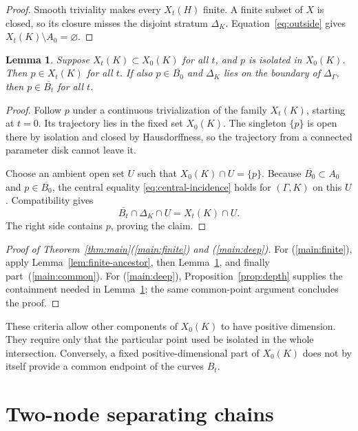 \documentclass[11pt]{article}
\newcommand{\cl}[1]{\overline{#1}}
\newtheorem{lemma}[theorem]{Lemma}
\theoremstyle{definition}
\theoremstyle{remark}
\begin{document}
\begin{proof}
Smooth triviality makes every $X_t(H)$ finite. A finite subset of $X$ is closed, so its closure misses the disjoint stratum $\Delta_K$. Equation~\eqref{eq:outside} gives $X_t(K)\setminus A_0=\varnothing$.
\end{proof}

\begin{lemma}\label{lem:isolated}
Suppose $X_t(K)\subset X_0(K)$ for all $t$, and $p$ is isolated in $X_0(K)$. Then $p\in X_t(K)$ for all $t$. If also $p\in\cl{B_0}$ and $\Delta_K$ lies on the boundary of $\Delta_\Gamma$, then $p\in\cl{B_t}$ for all $t$.
\end{lemma}

\begin{proof}
Follow $p$ under a continuous trivialization of the family $X_t(K)$, starting at $t=0$. Its trajectory lies in the fixed set $X_0(K)$. The singleton $\{p\}$ is open there by isolation and closed by Hausdorffness, so the trajectory from a connected parameter disk cannot leave it.

Choose an ambient open set $U$ such that $X_0(K)\cap U=\{p\}$. Because $\cl{B_0}\subset A_0$ and $p\in\cl{B_0}$, the central equality \eqref{eq:central-incidence} holds for $(\Gamma,K)$ on this $U$. Compatibility gives
\[
 \cl{B_t}\cap\Delta_K\cap U=X_t(K)\cap U.
\]
The right side contains $p$, proving the claim.
\end{proof}

\begin{proof}[Proof of Theorem~\ref{thm:main}(\ref{main:finite}) and (\ref{main:deep})]
For (\ref{main:finite}), apply Lemma~\ref{lem:finite-ancestor}, then Lemma~\ref{lem:isolated}, and finally part~(\ref{main:common}). For (\ref{main:deep}), Proposition~\ref{prop:depth} supplies the containment needed in Lemma~\ref{lem:isolated}; the same common-point argument concludes the proof.
\end{proof}

These criteria allow other components of $X_0(K)$ to have positive dimension. They require only that the particular point used be isolated in the whole intersection. Conversely, a fixed positive-dimensional part of $X_0(K)$ does not by itself provide a common endpoint of the curves $B_t$.

\section{Two-node separating chains}\label{sec:two}
\end{document}
